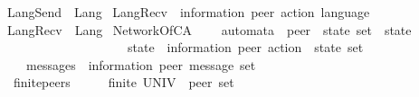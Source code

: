 \begin{isabellebody}
\ \ {\isachardoublequoteopen}LangSend\ {\isasymequiv}\ Lang{\isasymdownharpoonright}\isactrlsub {\isacharbang}{\kern0pt}{\isachardoublequoteclose}\isanewline
\isanewline
{}\isamarkupfalse%
\ LangRecv\ {\isacharcolon}{\kern0pt}{\isacharcolon}{\kern0pt}\ {\isachardoublequoteopen}{\isacharparenleft}{\kern0pt}{\isacharprime}{\kern0pt}information{\isacharcomma}{\kern0pt}\ {\isacharprime}{\kern0pt}peer{\isacharparenright}{\kern0pt}\ action\ language{\isachardoublequoteclose}\ \isanewline
\ \ {\isachardoublequoteopen}LangRecv\ {\isasymequiv}\ Lang{\isasymdownharpoonright}\isactrlsub {\isacharquery}{\kern0pt}{\isachardoublequoteclose}\isanewline
\isanewline
{}\isamarkupfalse%
%
\isadelimdocument
%
\endisadelimdocument
%
\isatagdocument
%
\isamarkuptrue%
%
\endisatagdocument
{\isafolddocument}%
%
\isadelimdocument
%
\endisadelimdocument
{}\isamarkupfalse%
\ NetworkOfCA\ {\isacharequal}{\kern0pt}\isanewline
\ \ \ automata\ {\isacharcolon}{\kern0pt}{\isacharcolon}{\kern0pt}\ {\isachardoublequoteopen}{\isacharprime}{\kern0pt}peer\ {\isasymRightarrow}\ {\isacharparenleft}{\kern0pt}{\isacharprime}{\kern0pt}state\ set\ {\isasymtimes}\ {\isacharprime}{\kern0pt}state\ {\isasymtimes}\isanewline
\ \ \ \ \ \ \ \ \ \ \ \ \ \ \ \ \ \ \ \ \ {\isacharparenleft}{\kern0pt}{\isacharprime}{\kern0pt}state\ {\isasymtimes}\ {\isacharparenleft}{\kern0pt}{\isacharprime}{\kern0pt}information{\isacharcomma}{\kern0pt}\ {\isacharprime}{\kern0pt}peer{\isacharparenright}{\kern0pt}\ action\ {\isasymtimes}\ {\isacharprime}{\kern0pt}state{\isacharparenright}{\kern0pt}\ set{\isacharparenright}{\kern0pt}{\isachardoublequoteclose}\ \ {\isacharparenleft}{\kern0pt}{\isachardoublequoteopen}{\isasymA}{\isachardoublequoteclose}\ {}{}{}{}{\isacharparenright}{\kern0pt}\isanewline
\ \ \ \ \ messages\ {\isacharcolon}{\kern0pt}{\isacharcolon}{\kern0pt}\ {\isachardoublequoteopen}{\isacharparenleft}{\kern0pt}{\isacharprime}{\kern0pt}information{\isacharcomma}{\kern0pt}\ {\isacharprime}{\kern0pt}peer{\isacharparenright}{\kern0pt}\ message\ set{\isachardoublequoteclose}\ \ \ \ \ \ \ \ \ \ \ \ \ \ \ \ \ \ \ \ \ \ \ {\isacharparenleft}{\kern0pt}{\isachardoublequoteopen}{\isasymM}{\isachardoublequoteclose}\ {}{}{}{}{\isacharparenright}{\kern0pt}\isanewline
\ \ \ finite{\isacharunderscore}{\kern0pt}peers{\isacharcolon}{\kern0pt}\ \ \ \ \ \ {\isachardoublequoteopen}finite\ {\isacharparenleft}{\kern0pt}UNIV\ {\isacharcolon}{\kern0pt}{\isacharcolon}{\kern0pt}\ {\isacharprime}{\kern0pt}peer\ set{\isacharparenright}{\kern0pt}{\isachardoublequoteclose}\isanewline

\end{isabellebody}
